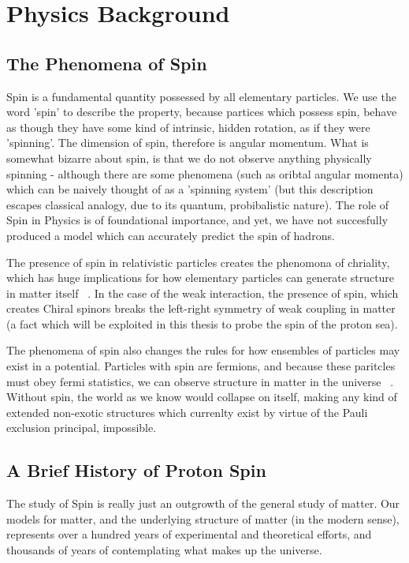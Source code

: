 \chapter{Physics Background}
\section{The Phenomena of Spin}

Spin is a fundamental quantity possessed by all elementary particles. We use
the word 'spin' to describe the property, because partices which possess spin,
behave as though they have some kind of intrinsic, hidden rotation, as if they
were 'spinning'. The dimension of spin, therefore is angular momentum. What is
somewhat bizarre about spin, is that we do not observe anything physically
spinning - although there are some phenomena (such as oribtal angular momenta)
which can be naively thought of as a 'spinning system' (but this description
escapes classical analogy, due to its quantum, probibalistic nature). The role
of Spin in Physics is of foundational importance, and yet, we have not
succesfully produced a model which can accurately predict the spin of hadrons.

The presence of spin in relativistic particles creates the phenomona of
chriality, which has huge implications for how elementary particles can generate
structure in matter itself ~\needcite{}. In the case of the weak interaction,
the presence of spin, which creates Chiral spinors breaks the left-right
symmetry of weak coupling in matter (a fact which will be exploited in this
thesis to probe the spin of the proton sea).

The phenomena of spin also changes the rules for how ensembles of particles may
exist in a potential. Particles with spin are fermions, and because these
paritcles must obey fermi statistics, we can observe structure in matter in the
universe ~\needcite{}. Without spin, the world as we know would collapse on
itself, making any kind of extended non-exotic structures which currenlty exist
by virtue of the Pauli exclusion principal, impossible.

\clearpage
\section{A Brief History of Proton Spin}

The study of Spin is really just an outgrowth of the general study of matter.
Our models for matter, and the underlying structure of matter (in the modern
sense), represents over a hundred years of experimental and theoretical efforts,
and thousands of years of contemplating what makes up the universe.

